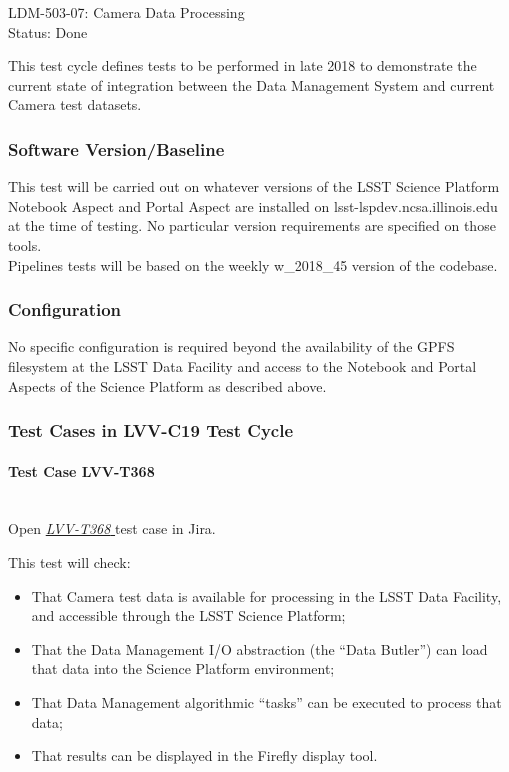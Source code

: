 \documentclass[DM,STR,toc]{lsstdoc}
\providecommand{\tightlist}{
  \setlength{\itemsep}{0pt}\setlength{\parskip}{0pt}}
\begin{document}
  LDM-503-07: Camera Data Processing\\
  Status: Done

  This test cycle defines tests to be performed in late 2018 to
demonstrate the current state of integration between the Data Management
System and current Camera test datasets.


  \subsubsection{Software Version/Baseline}
    This test will be carried out on whatever versions of the LSST Science
Platform Notebook Aspect and Portal Aspect are installed on
lsst-lspdev.ncsa.illinois.edu at the time of testing. No particular
version requirements are specified on those
tools.\\[2\baselineskip]Pipelines tests will be based on the weekly
w\_2018\_45 version of the codebase.~


  \subsubsection{Configuration}
    No specific configuration is required beyond the availability of the
GPFS filesystem at the LSST Data Facility and access to the Notebook and
Portal Aspects of the Science Platform as described above.


  \subsubsection{Test Cases in LVV-C19 Test Cycle}


    \paragraph{Test Case LVV-T368 }\mbox{}\\

Open  \href{https://jira.lsstcorp.org/secure/Tests.jspa#/testCase/LVV-T368}{\textit{ LVV-T368 } }
test case in Jira.

    This test will check:

\begin{itemize}
\tightlist
\item
  That Camera test data is available for processing in the LSST Data
  Facility, and accessible through the LSST Science Platform;
\item
  That the Data Management I/O abstraction (the ``Data Butler'') can
  load that data into the Science Platform environment;
\item
  That Data Management algorithmic ``tasks'' can be executed to process
  that data;
\item
  That results can be displayed in the Firefly display tool.
\end{itemize}
\end{document}
